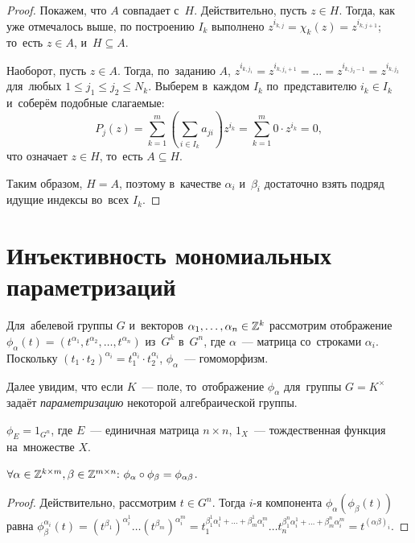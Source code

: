 \documentclass{article}
\begin{document}
\begin{proof}
    Покажем, что $A$ совпадает с~$H$. Действительно, пусть $z \in H$. Тогда, как уже отмечалось выше,
    по построению $I_k$ выполнено $z^{i_{k, j}} = \chi_k(z) = z^{i_{k, j + 1}}$; то~есть $z \in A$, и~$H \subseteq A$.

    Наоборот, пусть $z \in A$. Тогда, по~заданию $A$, $z^{i_{k, j_1}} = z^{i_{k, j_1 + 1}} = \ldots = z^{i_{k, j_2 - 1}} = z^{i_{k, j_2}}$
    для~любых $1 \leq j_1 \leq j_2 \leq N_k$. Выберем в~каждом $I_k$ по~представителю $i_k \in I_k$ и~соберём подобные слагаемые:
    $$
        P_j(z) = \sum_{k = 1}^{m} \left( \sum_{i \in I_k} a_{ji} \right) z^{i_k} = \sum_{k = 1}^{m} 0 \cdot z^{i_k} = 0,
    $$
    что означает $z \in H$, то~есть $A \subseteq H$.

    Таким образом, $H = A$, поэтому в~качестве $\alpha_i$ и~$\beta_i$ достаточно взять подряд идущие индексы во~всех $I_k$.
\end{proof}

\section{Инъективность мономиальных параметризаций}

Для~абелевой группы $G$ и~векторов $\alpha_1, \ldots, \alpha_n \in \mathbb{Z}^k$ рассмотрим отображение $\phi_\alpha(t) = (t^{\alpha_1}, t^{\alpha_2}, \ldots, t^{\alpha_n})$
из~$G^k$ в~$G^n$, где $\alpha$~— матрица со~строками $\alpha_i$. Поскольку $(t_1 \cdot t_2)^{\alpha_i} = t_1^{\alpha_i} \cdot t_2^{\alpha_i}$,
$\phi_\alpha$~— гомоморфизм.

Далее увидим, что если $K$~— поле, то~отображение $\phi_\alpha$ для~группы $G = K^\times$ задаёт \textit{параметризацию} некоторой алгебраической группы.

\begin{statement*}
    $\phi_{E} = 1_{G^n}$, где $E$~— единичная матрица $n \times n$, $1_X$~— тождественная функция на~множестве $X$.
\end{statement*}

\begin{statement*}
    $
        \forall \alpha \in \mathbb{Z}^{k \times m}, \beta \in \mathbb{Z}^{m \times n}{:}\ \phi_\alpha \circ \phi_\beta = \phi_{\alpha \beta}
    $.
\end{statement*}

\begin{proof}
    Действительно, рассмотрим $t \in G^n$. Тогда $i$-я компонента $\phi_\alpha(\phi_\beta(t))$
    равна $\phi_\beta^{\alpha_i}(t) = (t^{\beta_1})^{\alpha_i^1} \ldots (t^{\beta_m})^{\alpha_i^m}
                                    = t_1^{\beta_1^1 \alpha_i^1 + \ldots + \beta_m^1 \alpha_i^m}
                                      \ldots
                                      t_n^{\beta_1^n \alpha_i^1 + \ldots + \beta_m^n \alpha_i^m}
                                    = t^{(\alpha \beta)_i}$.
\end{proof}
\end{document}
